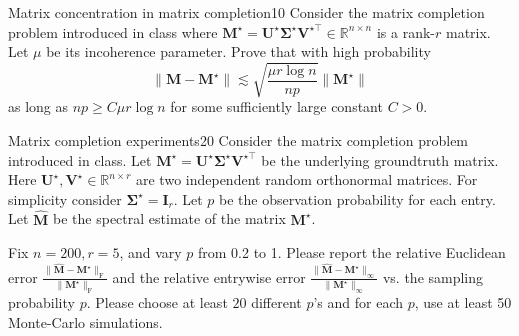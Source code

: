 \documentclass{article}
\begin{document}
\begin{problem}{Matrix concentration in matrix completion}{10}
	Consider the matrix completion problem introduced in class where $\bm{M}^{\star} = \bm{U}^\star \bm{\Sigma}^{\star} \bm{V}^{\star \top} \in \mathbb{R}^{n \times n}$ is a rank-$r$ matrix. Let $\mu$ be its incoherence parameter. Prove that with high probability 
	\[
	\|\bm{M} - \bm{M}^{\star}\| \lesssim \sqrt{\frac{\mu r \log n}{n p}} \|\bm{M}^\star\|
	\]
	as long as $n p \geq C \mu r \log n$ for some sufficiently large constant $C > 0$.
\end{problem}

\begin{problem}{Matrix completion experiments}{20}
Consider the matrix completion problem introduced in class. Let $\bm{M}^\star = \bm{U}^\star \bm{\Sigma}^\star \bm{V}^{\star\top} $ be the underlying groundtruth matrix. Here $\bm{U}^\star, \bm{V}^\star \in \mathbb{R}^{n \times r}$ are two independent random orthonormal matrices. For simplicity consider $\bm{\Sigma}^\star = \bm{I}_{r}$. Let $p$ be the observation probability for each entry. Let $\hat{\bm{M}}$ be the spectral estimate of the matrix $\bm{M}^\star$.

Fix $n=200, r=5$, and vary $p$ from 0.2 to 1. Please report the relative Euclidean error $\frac{\|\hat{\bm{M}} - \bm{M}^\star\|_{\mathrm{F}}}{\|\bm{M}^\star\|_{\mathrm{F}}}$ and the relative entrywise error $\frac{\|\hat{\bm{M}} - \bm{M}^\star\|_{\infty}}{\|\bm{M}^\star\|_{\infty}}$ vs. the sampling probability $p$. Please choose at least $20$ different $p$'s and for each $p$, use at least 50 Monte-Carlo simulations.
\end{problem}
\end{document}
